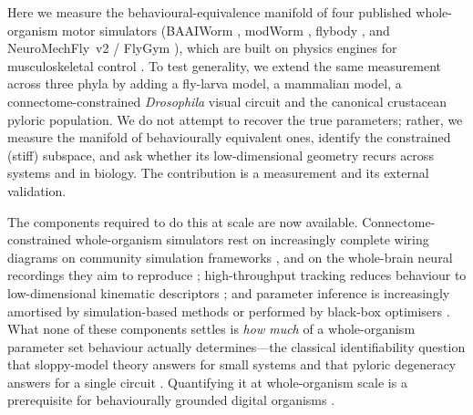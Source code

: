 \documentclass[11pt]{article}
\begin{document}
Here we measure the behavioural-equivalence manifold of four published whole-organism motor simulators (BAAIWorm \citep{wang2025baaiworm}, modWorm \citep{shlizerman2025modworm}, flybody \citep{vaxenburg2025flybody}, and NeuroMechFly~v2 / FlyGym \citep{wangchen2024neuromechfly,lobatorios2022neuromechfly}), which are built on physics engines for musculoskeletal control \citep{todorov2012mujoco,delp2007opensim}. To test generality, we extend the same measurement across three phyla by adding a fly-larva model, a mammalian model, a connectome-constrained \emph{Drosophila} visual circuit and the canonical crustacean pyloric population. We do not attempt to recover the true parameters; rather, we measure the manifold of behaviourally equivalent ones, identify the constrained (stiff) subspace, and ask whether its low-dimensional geometry recurs across systems and in biology. The contribution is a measurement and its external validation.

The components required to do this at scale are now available. Connectome-constrained whole-organism simulators rest on increasingly complete wiring diagrams \citep{white1986structure,varshney2011structural,cook2019connectome,witvliet2021connectomes,yan2017network,scheffer2020connectome,dorkenwald2024flywire,azevedo2024connectomic} on community simulation frameworks \citep{szigeti2014openworm,sarma2018openworm,gleeson2018c302,hines1997neuron}, and on the whole-brain neural recordings they aim to reproduce \citep{kato2015global,nguyen2016whole,randi2023multimodal}; high-throughput tracking reduces behaviour to low-dimensional kinematic descriptors \citep{stephens2008dimensionality,stephens2011emergence,brown2013dictionary,yemini2013openworm,javer2018open,pereira2022sleap,karashchuk2021anipose,pereira2020quantifying}; and parameter inference is increasingly amortised by simulation-based methods \citep{cranmer2020frontier,goncalves2020training,tejero2020sbi,papamakarios2017maf,durkan2019nsf} or performed by black-box optimisers \citep{spall1992multivariate,hansen2001completely,hansen2016cma,spall2003introduction}. What none of these components settles is \emph{how much} of a whole-organism parameter set behaviour actually determines---the classical identifiability question \citep{villaverde2014reverse,saltelli2008global} that sloppy-model theory answers for small systems \citep{gutenkunst2007universally,transtrum2015perspective,sethna2010sloppy,transtrum2010sloppy} and that pyloric degeneracy answers for a single circuit \citep{prinz2004similar,marder2006variability}. Quantifying it at whole-organism scale is a prerequisite for behaviourally grounded digital organisms \citep{karr2012whole,zador2023catalyzing,urai2022largescale,bargmann2013connectome}.
\end{document}
